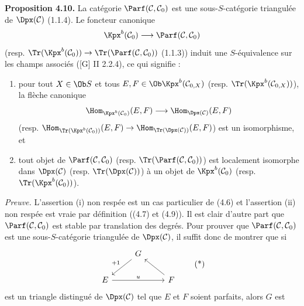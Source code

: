 \textbf{Proposition 4.10.} La catégorie \(\Parf(\mathcal C,\mathcal C_0)\) est une sous-\(S\)-catégorie triangulée de \(\Dpx(\mathcal C)\) (1.1.4). Le foncteur canonique
\[
  \Kpx^b(\mathcal C_0)\longrightarrow\Parf(\mathcal C,\mathcal C_0)
\]
(resp. \(\Tr(\Kpx^b(\mathcal C_0))\to\Tr(\Parf(\mathcal C,\mathcal C_0))\) (1.1.3)) induit une \(S\)-équivalence sur les champs associés ([G] II 2.2.4), ce qui signifie :
\begin{enumerate}[label=(\roman*)]
\item pour tout \(X\in\Ob S\) et tous \(E,F\in\Ob\Kpx^b(\mathcal C_{0,X})\) (resp. \(\Tr(\Kpx^b(\mathcal C_{0,X}))\)), la flèche canonique
\[
  \Hom_{\Kpx^b(\mathcal C_0)}(E,F)
  \longrightarrow
  \Hom_{\Dpx(\mathcal C)}(E,F)
\]
(resp. \(\Hom_{\Tr(\Kpx^b(\mathcal C_0))}(E,F)\to\Hom_{\Tr(\Dpx(\mathcal C))}(E,F)\)) est un isomorphisme, et
\item tout objet de \(\Parf(\mathcal C,\mathcal C_0)\) (resp. \(\Tr(\Parf(\mathcal C,\mathcal C_0))\)) est localement isomorphe dans \(\Dpx(\mathcal C)\) (resp. \(\Tr(\Dpx(\mathcal C))\)) à un objet de \(\Kpx^b(\mathcal C_0)\) (resp. \(\Tr(\Kpx^b(\mathcal C_0))\)).
\end{enumerate}

\emph{Preuve.} L'assertion (i) non respée est un cas particulier de (4.6) et l'assertion (ii) non respée est vraie par définition ((4.7) et (4.9)). Il est clair d'autre part que \(\Parf(\mathcal C,\mathcal C_0)\) est stable par translation des degrés. Pour prouver que \(\Parf(\mathcal C,\mathcal C_0)\) est une sous-\(S\)-catégorie triangulée de \(\Dpx(\mathcal C)\), il suffit donc de montrer que si
\[
\begin{tikzcd}
& G \arrow[dl,"+1"'] & \\
E \arrow[rr,"u"] && F \arrow[ul]
\end{tikzcd}
\tag{*}
\]
est un triangle distingué de \(\Dpx(\mathcal C)\) tel que \(E\) et \(F\) soient parfaits, alors \(G\) est
